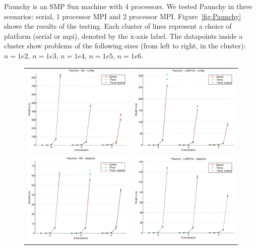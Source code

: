 \documentclass[10pt]{article}
\begin{document}
Paunchy is an SMP Sun machine with 4 processors. We tested Paunchy in three scenarios:
serial, 1 processor MPI and 2 processor MPI. Figure~\ref{fig:Paunchy} shows the results of
the testing. Each cluster of lines represent a choice of platform (serial or mpi), denoted
by the x-axis label. The datapoints inside a cluster show problems of the following sizes
(from left to right, in the cluster): $n=1e2$, $n=1e3$, $n=1e4$, $n=1e5$, $n=1e6$. 

\begin{figure}[htp]
\begin{tabular}{cc}
\includegraphics[width=2.50in]{results/paunchy/Paunchy-BD-LinAlg_ln.eps} &
\includegraphics[width=2.50in]{results/paunchy/Paunchy-LOBPCG-LinAlg_ln.eps} \\
\includegraphics[width=2.50in]{results/paunchy/Paunchy-BD-ApplyOp_ln.eps} &
\includegraphics[width=2.50in]{results/paunchy/Paunchy-LOBPCG-ApplyOp_ln.eps} \\

\end{tabular}
\end{figure}
\end{document}
